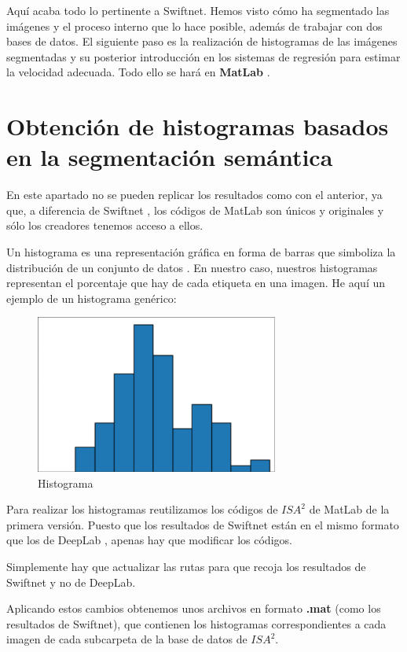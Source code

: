 Aquí acaba todo lo pertinente a Swiftnet. Hemos visto cómo ha segmentado las imágenes y el proceso interno que lo hace posible, además de trabajar con dos bases de datos. El siguiente paso es la realización de histogramas de las imágenes segmentadas y su posterior introducción en los sistemas de regresión para estimar la velocidad adecuada. Todo ello se hará en \textbf{MatLab} \cite{matlab}.

\section{Obtención de histogramas basados en la segmentación semántica}

En este apartado no se pueden replicar los resultados como con el anterior, ya que, a diferencia de Swiftnet \cite{swiftnet}, los códigos de MatLab \cite{matlab} son únicos y originales y sólo los creadores tenemos acceso a ellos.

Un histograma es una representación gráfica en forma de barras que simboliza la distribución de un conjunto de datos \cite{histograma}. En nuestro caso, nuestros histogramas representan el porcentaje que hay de cada etiqueta en una imagen. He aquí un ejemplo de un histograma genérico:

\begin{figure}[H]
  \centering
  \includegraphics[width=8cm]{Figuras/histograma.eps}
  \caption{Histograma}
\end{figure}

Para realizar los histogramas reutilizamos los códigos de $ISA^{2}$ \cite{isa2} de MatLab de la primera versión. Puesto que los resultados de Swiftnet están en el mismo formato que los de DeepLab \cite{deeplab}, apenas hay que modificar los códigos.

Simplemente hay que actualizar las rutas para que recoja los resultados de Swiftnet y no de DeepLab.

Aplicando estos cambios obtenemos unos archivos en formato \textbf{.mat} (como los resultados de Swiftnet), que contienen los histogramas correspondientes a cada imagen de cada subcarpeta de la base de datos de $ISA^{2}$.

